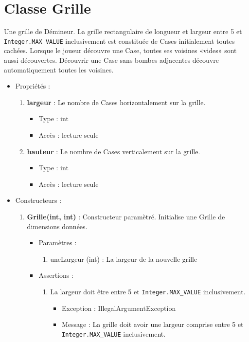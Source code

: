   \section {Classe Grille}

  Une grille de Démineur. La grille rectangulaire de longueur et largeur entre 5 et {\tt Integer.MAX_VALUE} inclusivement est constituée de Cases initialement toutes cachées. Lorsque le joueur découvre une Case, toutes ses voisines «vides» sont aussi découvertes. Découvrir une Case sans bombes adjacentes découvre automatiquement toutes les voisines.

  \begin{itemize}
  \item Propriétés : 
    \begin{enumerate}
    \item {\bf largeur} : Le nombre de Cases horizontalement sur la grille.
          \begin{itemize}
          \item Type : int
          \item Accès : lecture seule
          \end{itemize}
    \item {\bf hauteur} : Le nombre de Cases verticalement sur la grille.
          \begin{itemize}
          \item Type : int
          \item Accès : lecture seule
          \end{itemize}

    \end{enumerate}

  \item Constructeurs : 

  \begin{enumerate}
  \item {\bf Grille(int, int) }: Constructeur paramètré. Initialise une Grille de dimensions données.
    \begin{itemize}
    \item Paramètres : 
      \begin{enumerate}
      \item uneLargeur (int) : La largeur de la nouvelle grille
      \end{enumerate}
    \item Assertions : 
      \begin{enumerate}
      \item La largeur doit être entre 5 et {\tt Integer.MAX_VALUE} inclusivement.
        \begin{itemize}
          \item Exception : IllegalArgumentException
          \item Message : La grille doit avoir une largeur comprise entre 5 et {\tt Integer.MAX_VALUE} inclusivement.
        \end{itemize}
      \end{enumerate}
      

\end{itemize}
\end{enumerate}
\end{itemize}
